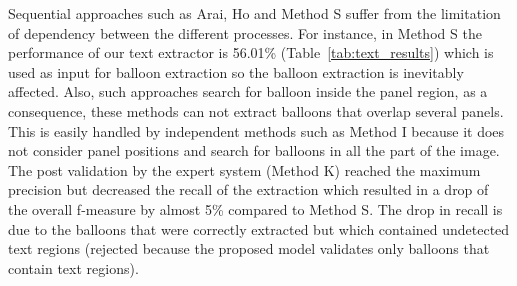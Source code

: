 


Sequential approaches such as Arai, Ho and Method S suffer from the limitation of dependency between the different processes.
For instance, in Method S the performance of our text extractor is 56.01\% (Table~\ref{tab:text_results}) which is used as input for balloon extraction so the balloon extraction is inevitably affected.
Also, such approaches search for balloon inside the panel region, as a consequence, these methods can not extract balloons that overlap several panels.
This is easily handled by independent methods such as Method I because it does not consider panel positions and search for balloons in all the part of the image.
The post validation by the expert system (Method K) reached the maximum precision but decreased the recall of the extraction which resulted in a drop of the overall f-measure by almost 5\% compared to Method S.
The drop in recall is due to the balloons that were correctly extracted but which contained undetected text regions (rejected because the proposed model validates only balloons that contain text regions).



